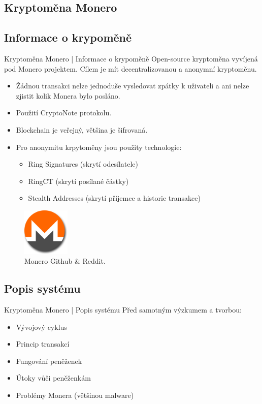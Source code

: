 \documentclass{beamer}
\begin{document}
  \begin{darkframes}
    \section{Kryptoměna Monero}
    \subsection{Informace o krypoměně}
    \begin{frame}{Kryptoměna Monero | Informace o krypoměně}
    Open-source kryptoměna vyvíjená pod Monero projektem.
    Cílem je mít decentralizovanou a anonymní kryptoměnu.
    
\begin{itemize}[<+->]
\item<1-4>  Žádnou transakci nelze jednoduše vysledovat zpátky k uživateli a ani nelze zjistit kolik Monera bylo posláno.
\item<2-4> Použití CryptoNote protokolu.
\item<3-4> Blockchain je veřejný, většina je šifrovaná.
\item<4-4> Pro anonymitu krpytoměny jsou použity technologie: 
\begin{itemize}
\item Ring Signatures (skrytí odesílatele)
\item RingCT (skrytí posílané částky)
\item Stealth Addresses (skrytí příjemce a historie transakce)
\end{itemize}
\end{itemize}    

     \begin{figure}
  \includegraphics[width=0.2\textwidth]{monero-icon.png}
  \caption{Monero Github \& Reddit.}  \label{fig:xray}
\end{figure}
    \end{frame}
    \subsection{Popis systému}
    \begin{frame}{Kryptoměna Monero | Popis systému}
   Před samotným výzkumem a tvorbou:
     \begin{itemize}[<+->]
     \item<1-3> Vývojový cyklus
     \item<1-3> Princip transakcí
     \item<2-3> Fungování peněženek
     \item<2-3> Útoky vůči peněženkám
     \item<3-3> Problémy Monera (většinou malware)
     \end{itemize}
    \end{frame}
  \end{darkframes}
\end{document}
